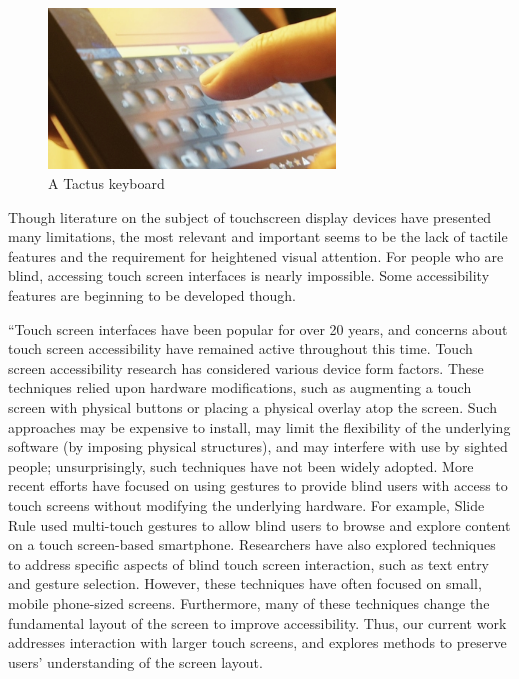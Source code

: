\documentclass{article}
\begin{document}
\begin{figure}[ht]
\centering
\includegraphics[width=3in]{tactus-keyboard.jpg} 
\caption{A Tactus keyboard}
\label{figure-sample}
\end{figure}
Though literature on the subject of touchscreen display devices have presented many limitations, the most relevant and important seems to be the lack of tactile features and the requirement for heightened visual attention. For people who are blind, accessing touch screen interfaces is nearly impossible. Some accessibility features are beginning to be developed though.

``Touch screen interfaces have been popular for over 20 years, and concerns about touch screen accessibility have remained active throughout this time.\cite{Buxton:1986:HID:22339.22386} Touch 
screen accessibility research has considered various device 
form factors. These techniques relied upon hardware modifications, 
such as augmenting a touch screen with physical buttons or 
placing a physical overlay atop the screen. Such approaches 
may be expensive to install, may limit the flexibility of the 
underlying software (by imposing physical structures), and 
may interfere with use by sighted people; unsurprisingly, 
such techniques have not been widely adopted. 
More recent efforts have focused on using gestures to 
provide blind users with access to touch screens without 
modifying the underlying hardware. For example, Slide 
Rule\cite{Kane:2008:SRM:1414471.1414487} used multi-touch gestures to allow blind users to 
browse and explore content on a touch screen-based smartphone.  Researchers have also explored techniques to 
address specific aspects of blind touch screen interaction, 
such as text entry and gesture selection\cite{conf/chi/KaneWL11}. 
However, these techniques have often focused on small, 
mobile phone-sized screens. Furthermore, many of these 
techniques change the fundamental layout of the screen to 
improve accessibility. Thus, our current work addresses 
interaction with larger touch screens, and explores methods 
to preserve users’ understanding of the screen layout. 
\end{document}
